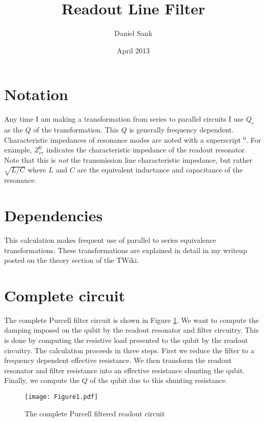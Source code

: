 \documentclass[english,aps,prl]{revtex4}
\begin{document}
\title{Readout Line Filter}

\author{Daniel Sank} 

\date{April 2013}

\maketitle

\section{Notation}
Any time I am making a transformation from series to parallel circuits I use $Q_e$ as the $Q$ of the transformation. This $Q$ is generally frequency dependent. Characteristic impedances of resonance modes are noted with a superscript $^0$. For example, $Z_{rr}^0$ indicates the characteristic impedance of the readout resonator. Note that this is \emph{not} the transmission line characteristic impedance, but rather $\sqrt{L/C}$ where $L$ and $C$ are the equivalent inductance and capacitance of the resonance.

\section{Dependencies}
This calculation makes frequent use of parallel to series equivalence transformations. These transformations are explained in detail in my writeup posted on the theory section of the TWiki.

\section{Complete circuit}

The complete Purcell filter circuit is shown in Figure \ref{Fig:1}. We want to compute the damping imposed on the qubit by the readout resonator and filter circuitry. This is done by computing the resistive load presented to the qubit by the readout circuitry. The calculation proceeds in three steps. First we reduce the filter to a frequency dependent effective resistance. We then transform the readout resonator and filter resistance into an effective resistance shunting the qubit. Finally, we compute the $Q$ of the qubit due to this shunting resistance.

\begin{figure}
\begin{centering}
\texttt{[image: Figure1.pdf]} 
\par\end{centering}
\caption{The complete Purcell filtered readout circuit}
\label{Fig:1}
\end{figure}
\end{document}
